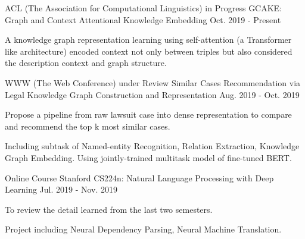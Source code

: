 

\begin{cventries}

  \cventry
    {ACL (The Association for Computational Linguistics) in Progress} %
    {GCAKE: Graph and Context Attentional Knowledge Embedding} %
    {} %
    {Oct. 2019 - Present} %
    {
      \begin{cvitems} %
        \item {A knowledge graph representation learning using self-attention (a Transformer like architecture) encoded context not only between triples but also considered the description context and graph structure.}
      \end{cvitems}
    }

  \cventry
    {WWW (The Web Conference) under Review} %
    {Similar Cases Recommendation via Legal Knowledge Graph Construction and Representation} %
    {} %
    {Aug. 2019 - Oct. 2019} %
    {
      \begin{cvitems} %
        \item {Propose a pipeline from raw lawsuit case into dense representation to compare and recommend the top k most similar cases.}
        \item {Including subtask of Named-entity Recognition, Relation Extraction, Knowledge Graph Embedding. Using jointly-trained multitask model of fine-tuned BERT.}
      \end{cvitems}
    }

  \cventry
    {Online Course} %
    {Stanford CS224n: Natural Language Processing with Deep Learning} %
    {} %
    {Jul. 2019 - Nov. 2019} %
    {
      \begin{cvitems} %
        \item {To review the detail learned from the last two semesters.}
        \item {Project including Neural Dependency Parsing, Neural Machine Translation.}
      \end{cvitems}
    }


\end{cventries}
